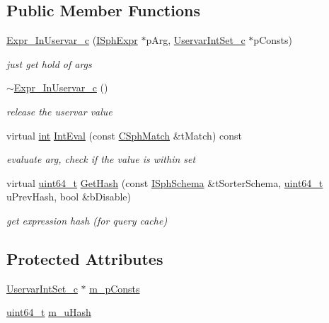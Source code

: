 \subsection*{Public Member Functions}
\begin{DoxyCompactItemize}
\item 
\hyperlink{classExpr__InUservar__c_aa417d60ad89dffdfbf843eb5ed7ef2e3}{Expr\-\_\-\-In\-Uservar\-\_\-c} (\hyperlink{structISphExpr}{I\-Sph\-Expr} $\ast$p\-Arg, \hyperlink{classUservarIntSet__c}{Uservar\-Int\-Set\-\_\-c} $\ast$p\-Consts)
\begin{DoxyCompactList}\small\item\em just get hold of args \end{DoxyCompactList}\item 
\hyperlink{classExpr__InUservar__c_a2f9606aad14c33cbf6d1cdda2074fe76}{$\sim$\-Expr\-\_\-\-In\-Uservar\-\_\-c} ()
\begin{DoxyCompactList}\small\item\em release the uservar value \end{DoxyCompactList}\item 
virtual \hyperlink{sphinxexpr_8cpp_a4a26e8f9cb8b736e0c4cbf4d16de985e}{int} \hyperlink{classExpr__InUservar__c_aa3e57dd1ffad312a56407a4f78ce51ec}{Int\-Eval} (const \hyperlink{classCSphMatch}{C\-Sph\-Match} \&t\-Match) const 
\begin{DoxyCompactList}\small\item\em evaluate arg, check if the value is within set \end{DoxyCompactList}\item 
virtual \hyperlink{sphinxstd_8h_aaa5d1cd013383c889537491c3cfd9aad}{uint64\-\_\-t} \hyperlink{classExpr__InUservar__c_a83d59b415c64e50786e85d94e194d0d2}{Get\-Hash} (const \hyperlink{classISphSchema}{I\-Sph\-Schema} \&t\-Sorter\-Schema, \hyperlink{sphinxstd_8h_aaa5d1cd013383c889537491c3cfd9aad}{uint64\-\_\-t} u\-Prev\-Hash, bool \&b\-Disable)
\begin{DoxyCompactList}\small\item\em get expression hash (for query cache) \end{DoxyCompactList}\end{DoxyCompactItemize}
\subsection*{Protected Attributes}
\begin{DoxyCompactItemize}
\item 
\hyperlink{classUservarIntSet__c}{Uservar\-Int\-Set\-\_\-c} $\ast$ \hyperlink{classExpr__InUservar__c_a7f8d487e17c9399ffeb53852c32cfe95}{m\-\_\-p\-Consts}
\item 
\hyperlink{sphinxstd_8h_aaa5d1cd013383c889537491c3cfd9aad}{uint64\-\_\-t} \hyperlink{classExpr__InUservar__c_a70f97222d4bfbbc9865acbb02f4e8951}{m\-\_\-u\-Hash}
\end{DoxyCompactItemize}
